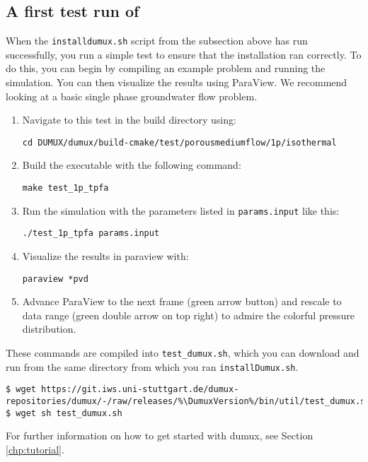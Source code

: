 \subsection{A first test run of \Dumux}
When the \texttt{installdumux.sh} script from the subsection above has run successfully,
you run a simple test to ensure that the installation ran correctly. To do this, you can
begin by compiling an example problem and running the simulation. You can then visualize
the results using ParaView. We recommend looking at a basic single phase groundwater flow problem.
\begin{enumerate}
\item Navigate to this test in the build directory using:
\begin{lstlisting}[style=Bash]
cd DUMUX/dumux/build-cmake/test/porousmediumflow/1p/isothermal
\end{lstlisting}
\item Build the executable with the following command:
\begin{lstlisting}[style=Bash]
make test_1p_tpfa
\end{lstlisting}
\item Run the simulation with the parameters listed in \texttt{params.input} like this:
\begin{lstlisting}[style=Bash]
./test_1p_tpfa params.input
\end{lstlisting}
\item Visualize the results in paraview with:
\begin{lstlisting}[style=Bash]
paraview *pvd
\end{lstlisting}
\item Advance ParaView to the next frame (green arrow button) and rescale to data range
(green double arrow on top right) to admire the colorful pressure distribution.
\end{enumerate}

These commands are compiled into \texttt{test\_dumux.sh}, which you can download and run
from the same directory from which you ran \texttt{installDumux.sh}.

\begin{lstlisting}[style=Bash,escapechar=\%]
$ wget https://git.iws.uni-stuttgart.de/dumux-repositories/dumux/-/raw/releases/%\DumuxVersion%/bin/util/test_dumux.sh
$ wget sh test_dumux.sh
\end{lstlisting}

For further information on how to get started with dumux, see Section \ref{chp:tutorial}.
